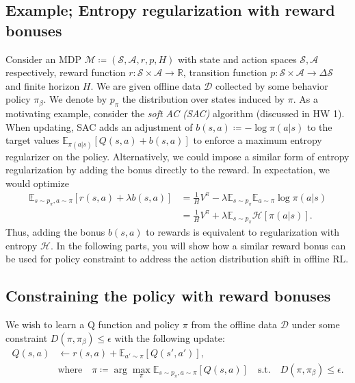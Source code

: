 \documentclass[letterpaper,12pt,addpoints]{exam}
\begin{document}
\subsection{Example; Entropy regularization with reward bonuses}
Consider an MDP $\mathcal{M}\coloneqq \left(\mathcal{S}, \mathcal{A}, r, p, H\right)$ with state and action spaces $\mathcal{S}, \mathcal{A}$ respectively, reward function $r:\mathcal{S}\times\mathcal{A}\rightarrow \mathbb{R}$, transition function $p:\mathcal{S}\times\mathcal{A}\rightarrow\Delta\mathcal{S}$ and finite horizon $H$.  We are given offline data $\mathcal{D}$ collected by some behavior policy $\pi_\beta$. We denote by $p_\pi$ the distribution over states induced by $\pi$. As a motivating example, consider the {\it soft AC (SAC)} algorithm (discussed in HW 1). When updating,
SAC adds an adjustment of $b(s,a) \coloneqq - \log \pi(a | s)$ to the target values $\mathbb{E}_{\pi(a|s)}\left[Q(s,a) + b(s,a)\right]$ to enforce
a maximum entropy regularizer on the policy. Alternatively, we could impose a similar form of entropy regularization by adding the bonus directly to the reward. In expectation, we would optimize
\begin{align*}
    \mathbb{E}_{s\sim p_\pi,a\sim \pi} [r(s,a) + \lambda b(s,a)] &= \frac{1}{H} V^\pi - \lambda \mathbb{E}_{s\sim p_\pi} \mathbb{E}_{a\sim\pi} \log \pi(a | s) \\
    &= \frac{1}{H} V^\pi + \lambda \mathbb{E}_{s\sim p_\pi} \mathcal{H}[\pi(a | s)].
\end{align*}
Thus, adding the bonus $b(s, a)$ to rewards is equivalent to regularization with entropy $\mathcal{H}$. In the following parts, you will show how a similar reward bonus can be used for policy constraint to address the action distribution shift in offline RL.

\subsection{Constraining the policy with reward bonuses}
We wish to learn a Q function and policy $\pi$ from the offline data $\mathcal{D}$ under some constraint $D(\pi, \pi_\beta) \leq \epsilon$ with
the following update:
\begin{align}\label{eq:q-update}
    Q(s,a) &\leftarrow r(s,a) + \mathbb{E}_{a' \sim \pi} [Q(s',a')], \\\label{eq:pi-constraint}
    &\text{where} \quad \pi \coloneqq \arg \max_\pi \mathbb{E}_{s\sim p_\pi,a \sim \pi} [Q(s,a)] \quad \text{s.t.} \quad D(\pi, \pi_\beta) \leq \epsilon.
\end{align}
\end{document}
